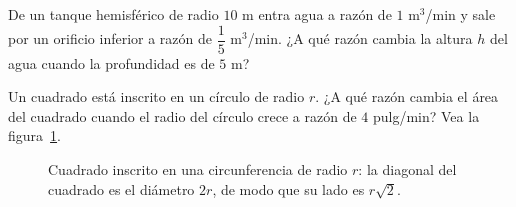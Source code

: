 \begin{prob}
De un tanque hemisférico de radio $10$ m entra agua a razón de
$1$ m$^3$/min y sale por un orificio inferior a razón de
$\dfrac{1}{5}$ m$^3$/min. ¿A qué razón cambia la altura $h$ del agua
cuando la profundidad es de $5$ m?
\end{prob}

\begin{prob}
Un cuadrado está inscrito en un círculo de radio $r$. ¿A qué razón
cambia el área del cuadrado cuando el radio del círculo crece a razón
de $4$ pulg/min? Vea la figura~\ref{fig:cuadrado_inscrito}.
\begin{figure}[!htbp]
\centering
{}
\caption{Cuadrado inscrito en una circunferencia de radio $r$: la diagonal
  del cuadrado es el diámetro $2r$, de modo que su lado es $r\sqrt2$.}
\label{fig:cuadrado_inscrito}
\end{figure}
\end{prob}

